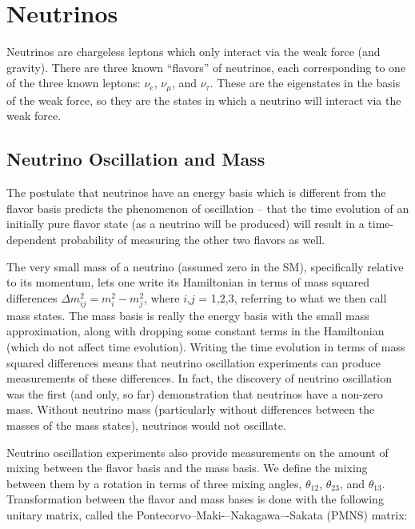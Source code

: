 \section{Neutrinos}

Neutrinos are chargeless leptons which only interact via the weak force (and gravity).  There are three known ``flavors'' of neutrinos, each corresponding to one of the three known leptons:  $\nu_{e}$, $\nu_{\mu}$, and $\nu_{\tau}$.  These are the eigenstates in the basis of the weak force, so they are the states in which a neutrino will interact via the weak force.

\subsection{Neutrino Oscillation and Mass}

The postulate that neutrinos have an energy basis which is different from the flavor basis predicts the phenomenon of oscillation -- that the time evolution of an initially pure flavor state (as a neutrino will be produced) will result in a time-dependent probability of measuring the other two flavors as well.  

The very small mass of a neutrino (assumed zero in the SM), specifically relative to its momentum, lets one write its Hamiltonian in terms of mass squared differences $\Delta m_{ij}^{2} = m_{i}^{2} - m_{j}^{2}$, where $i$,$j$ = 1,2,3, referring to what we then call mass states.  The mass basis is really the energy basis with the small mass approximation, along with dropping some constant terms in the Hamiltonian (which do not affect time evolution).  Writing the time evolution in terms of mass squared differences means that neutrino oscillation experiments can produce measurements of these differences.  In fact, the discovery of neutrino oscillation was the first (and only, so far) demonstration that neutrinos have a non-zero mass.  Without neutrino mass (particularly without differences between the masses of the mass states), neutrinos would not oscillate.

Neutrino oscillation experiments also provide measurements on the amount of mixing between the flavor basis and the mass basis.  We define the mixing between them by a rotation in terms of three mixing angles, $\theta_{12}$, $\theta_{23}$, and $\theta_{13}$.  Transformation between the flavor and mass bases is done with the following unitary matrix, called the Pontecorvo--Maki-–Nakagawa–-Sakata (PMNS) matrix:

